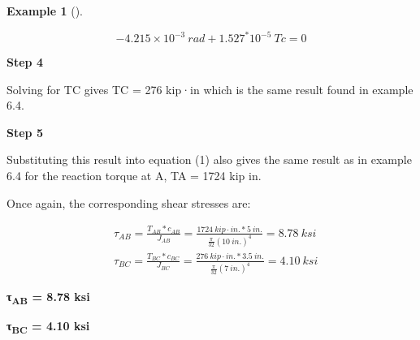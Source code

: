 \documentclass[
  letterpaper,
  DIV=11,
  numbers=noendperiod]{scrreprt}
\theoremstyle{definition}
\newtheorem{example}{Example}[chapter]
\theoremstyle{remark}
\begin{document}
\begin{tcolorbox}
\begin{example}[]
\begin{tcolorbox}
\[
-4.215 \times 10^{-3}{~rad}+1.527^* 10^{-5}~T{c}=0
\]

\textbf{Step 4}

Solving for TC gives TC = 276 kip·in which is the same result found in
example 6.4.

\textbf{Step 5}

Substituting this result into equation (1) also gives the same result as
in example 6.4 for the reaction torque at A, TA = 1724 kip in.

Once again, the corresponding shear stresses are:

\[
\begin{aligned}
& \tau_{AB}=\frac{T_{AB}*c_{AB}}{J_{AB}}=\frac{1724{~kip}\cdot{in.}*5{~in.}}{\frac{\pi}{32}(10{~in.})^4}=8.78{~ksi} \\
& \tau_{BC}=\frac{T_{BC}*c_{BC}}{J_{BC}}=\frac{276{~kip}\cdot{in.}*3.5{~in.}}{\frac{\pi}{32}(7{~in.})^4}=4.10{~ksi}
\end{aligned}
\]

\textbf{τ\textsubscript{AB} = 8.78 ksi}

\textbf{τ\textsubscript{BC} = 4.10 ksi}

\end{tcolorbox}

\end{example}

\end{tcolorbox}
\end{document}
